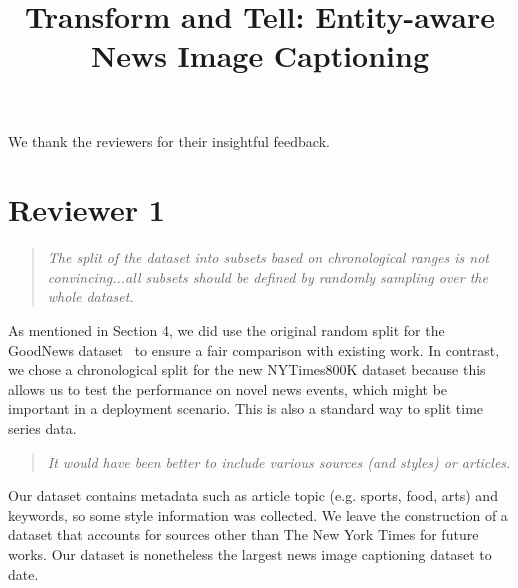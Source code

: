 \documentclass[10pt,twocolumn,letterpaper]{article}
\newcommand{\eat}[1]{{}}
\begin{document}
\title{Transform and Tell: Entity-aware News Image Captioning}  %

\maketitle
\thispagestyle{empty}



We thank the reviewers for their insightful feedback.

\section{Reviewer 1}

\begin{quote}
\textit{The split of the dataset into subsets based on chronological ranges is
not convincing...all subsets should be defined by randomly sampling over the
whole dataset.}
\end{quote}
As mentioned in Section 4, we did use the original random split for the
GoodNews dataset~\cite{Biten2019GoodNews} to ensure a fair comparison with
existing work. In contrast, we chose a chronological split for the new
NYTimes800K dataset because this allows us to test the performance on novel
news events, which might be important in a deployment scenario. This is also a
standard way to split time series data.

\eat{As we wrote in Section 4 of the paper, splitting our NYTimes800K dataset by
chronological range is the standard way to split time series data since it
allows us to see how well the model can handle the covariate shift, if there is
any. Furthermore, for the GoodNews dataset, we kept the original random
split used by \cite{Biten2019GoodNews}. Thus in Table 3, we can see the results
using both the random split (on GoodNews) and the chronological split (on
NYTimes800K).}


\begin{quote}\textit{It would have been better to include various sources (and
styles) or articles.}
\end{quote}
Our dataset contains metadata such as article topic (e.g. sports, food, arts)
and keywords, so some style information was collected. We leave the
construction of a dataset that accounts for sources other than The New York
Times for future works. Our dataset is nonetheless the largest news image
captioning dataset to date.
\end{document}
